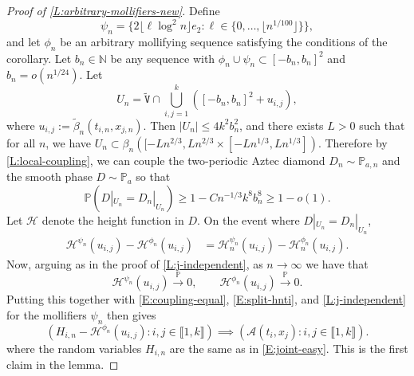\documentclass[11pt,twoside]{amsart}
\theoremstyle{plain}
\numberwithin{quest}{section}
\theoremstyle{remark}
\numberwithin{rem}{section}
\theoremstyle{definition}
\newcommand{\N}{\mathbb{N}}
\renewcommand{\P}{\mathbb{P}}
\newcommand{\cA}{\mathcal{A}}
\newcommand{\cH}{\mathcal{H}}
\newcommand{\II}[1]{\llbracket #1 \rrbracket}
\newcommand{\cvgp}{\stackrel{\mathbb P}{\to}}
\renewcommand{\tt}[1]{{\mathtt{#1}}}
\begin{document}
	\begin{proof}[Proof of \cref{L:arbitrary-mollifiers-new}]
		Define
		$$
		\psi_n = \{2\lfloor \ell \log^2 n \rfloor e_2 : \ell \in \{0, \dots, \lfloor n^{1/100} \rfloor \} \},
		$$
		and let $\phi_n$ be an arbitrary mollifying sequence satisfying the conditions of the corollary.
		Let $b_n \in \N$ be any sequence with $\phi_n \cup \psi_n \subset [-b_n, b_n]^2$ and $b_n = o(n^{1/24})$. Let 
		$$
		U_n = \tt{\tilde V} \cap \bigcup_{i, j = 1}^k ([-b_n, b_n]^2 + u_{i, j}),
		$$
		where $u_{i, j} := \tilde \beta_n(t_{i, n}, x_{j, n})$.
		Then $|U_n| \le 4 k^2 b_n^2$, and there exists $L > 0$ such that for all $n$, we have $U_n \subset \beta_n([-L n^{2/3}, L n^{2/3} \times [-L n^{1/3}, L n^{1/3}])$. Therefore by \cref{L:local-coupling}, we can couple the two-periodic Aztec diamond $D_n \sim \P_{a, n}$ and the smooth phase $D \sim \P_a$ so that 
		\begin{equation}
			\label{E:coupling-equal}
			\P(D|_{U_n} = D_n|_{U_n}) \ge 1 - C n^{-1/3} k^8 b_n^8 \ge 1 - o(1).
		\end{equation}
		Let $\cH$ denote the height function in $D$.  On the event where $D|_{U_n} = D_n|_{U_n}$,
		\begin{equation}
			\label{E:split-hnti}
			\begin{split}
				\cH^{\psi_n}(u_{i, j}) - \cH^{\phi_n}(u_{i, j}) &= \cH_n^{\psi_n}(u_{i, j}) - \cH^{\phi_n}_n(u_{i, j}).
			\end{split}
		\end{equation}
		Now, arguing as in the proof of \cref{L:j-independent}, as $n \to \infty$ we have that
		\begin{equation}
			\label{E:hnpsin}
			\cH^{\psi_n}(u_{i, j}) \cvgp 0, \qquad \cH^{\phi_n}(u_{i, j}) \cvgp 0.
		\end{equation}
		Putting this together with \eqref{E:coupling-equal}, \eqref{E:split-hnti}, and \cref{L:j-independent} for the mollifiers $\psi_n$ then gives
		\begin{equation*}
			(H_{i, n} - \cH^{\phi_n}(u_{i, j}): i, j \in \II{1, k}) \implies (\cA(t_i, x_j) : i, j \in \II{1, k}).
		\end{equation*}
		where the random variables $H_{i, n}$ are the same as in \eqref{E:joint-easy}. This is the first claim in the lemma.
		

\end{proof}
\end{document}
